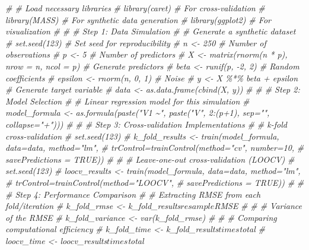 \documentclass[
]{article}
\newenvironment{Shaded}{\begin{snugshade}}{\end{snugshade}}
\newcommand{\CommentTok}[1]{\textcolor[rgb]{0.56,0.35,0.01}{\textit{#1}}}
\begin{document}
\begin{Shaded}
\begin{Highlighting}[]
\CommentTok{\# \# Load necessary libraries}
\CommentTok{\# library(caret) \# For cross{-}validation}
\CommentTok{\# library(MASS)  \# For synthetic data generation}
\CommentTok{\# library(ggplot2) \# For visualization}
\CommentTok{\# }
\CommentTok{\# \# Step 1: Data Simulation}
\CommentTok{\# \# Generate a synthetic dataset}
\CommentTok{\# set.seed(123) \# Set seed for reproducibility}
\CommentTok{\# n \textless{}{-} 250 \# Number of observations}
\CommentTok{\# p \textless{}{-} 5 \# Number of predictors}
\CommentTok{\# X \textless{}{-} matrix(rnorm(n * p), nrow = n, ncol = p) \# Generate predictors}
\CommentTok{\# beta \textless{}{-} runif(p, {-}2, 2) \# Random coefficients}
\CommentTok{\# epsilon \textless{}{-} rnorm(n, 0, 1) \# Noise}
\CommentTok{\# y \textless{}{-} X \%*\% beta + epsilon \# Generate target variable}
\CommentTok{\# data \textless{}{-} as.data.frame(cbind(X, y))}
\CommentTok{\# }
\CommentTok{\# \# Step 2: Model Selection}
\CommentTok{\# \# Linear regression model for this simulation}
\CommentTok{\# model\_formula \textless{}{-} as.formula(paste("V1 \textasciitilde{}", paste("V", 2:(p+1), sep="", collapse="+")))}
\CommentTok{\# }
\CommentTok{\# \# Step 3: Cross{-}validation Implementations}
\CommentTok{\# \# k{-}fold cross{-}validation}
\CommentTok{\# set.seed(123)}
\CommentTok{\# k\_fold\_results \textless{}{-} train(model\_formula, data=data, method="lm",}
\CommentTok{\#                         trControl=trainControl(method="cv", number=10, }
\CommentTok{\#                                                savePredictions = TRUE))}
\CommentTok{\# }
\CommentTok{\# \# Leave{-}one{-}out cross{-}validation (LOOCV)}
\CommentTok{\# set.seed(123)}
\CommentTok{\# loocv\_results \textless{}{-} train(model\_formula, data=data, method="lm",}
\CommentTok{\#                        trControl=trainControl(method="LOOCV", }
\CommentTok{\#                                               savePredictions = TRUE))}
\CommentTok{\# }
\CommentTok{\# \# Step 4: Performance Comparison}
\CommentTok{\# \# Extracting RMSE from each fold/iteration}
\CommentTok{\# k\_fold\_rmse \textless{}{-} k\_fold\_results$resample$RMSE}
\CommentTok{\# }
\CommentTok{\# \# Variance of the RMSE}
\CommentTok{\# k\_fold\_variance \textless{}{-} var(k\_fold\_rmse)}
\CommentTok{\# }
\CommentTok{\# \# Comparing computational efficiency}
\CommentTok{\# k\_fold\_time \textless{}{-} k\_fold\_results$times$total}
\CommentTok{\# loocv\_time \textless{}{-} loocv\_results$times$total}

\end{Highlighting}
\end{Shaded}
\end{document}
